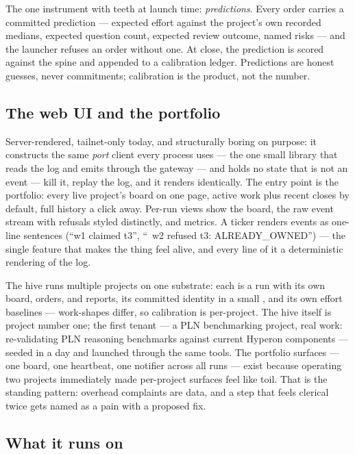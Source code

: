 The one instrument with teeth at launch time: \emph{predictions}. Every order carries a committed prediction --- expected effort against the project's own recorded medians, expected question count, expected review outcome, named risks --- and the launcher refuses an order without one. At close, the prediction is scored against the spine and appended to a calibration ledger. Predictions are honest guesses, never commitments; calibration is the product, not the number.

\subsection{The web UI and the portfolio}

Server-rendered, tailnet-only today, and structurally boring on purpose: it constructs the same \emph{port} client every process uses --- the one small library that reads the log and emits through the gateway --- and holds no state that is not an event --- kill it, replay the log, and it renders identically. The entry point is the portfolio: every live project's board on one page, active work plus recent closes by default, full history a click away. Per-run views show the board, the raw event stream with refusals styled distinctly, and metrics. A ticker renders events as one-line sentences (``w1 claimed t3'', ``\texttimes\ w2 refused t3: ALREADY\_OWNED'') --- the single feature that makes the thing feel alive, and every line of it a deterministic rendering of the log.

The hive runs multiple projects on one substrate: each is a run with its own board, orders, and reports, its committed identity in a small , and its own effort baselines --- work-shapes differ, so calibration is per-project. The hive itself is project number one; the first tenant --- a PLN benchmarking project, real work: re-validating PLN reasoning benchmarks against current Hyperon components --- seeded in a day and launched through the same tools. The portfolio surfaces --- one board, one heartbeat, one notifier across all runs --- exist because operating two projects immediately made per-project surfaces feel like toil. That is the standing pattern: overhead complaints are data, and a step that feels clerical twice gets named as a pain with a proposed fix.

\subsection{What it runs on}

